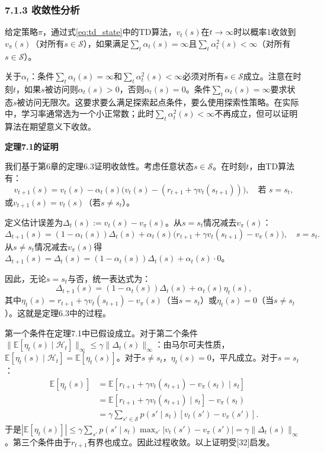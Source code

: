 \documentclass[UTF8]{article}
\begin{document}
\subsubsection*{7.1.3 收敛性分析}

\begin{theorembox}[7.1 TD学习的收敛性]
给定策略$\pi$，通过式\eqref{eq:td_state}中的TD算法，$v_t(s)$在$t \to \infty$时以概率1收敛到$v_\pi(s)$（对所有$s \in \mathcal{S}$），如果满足$\sum_t \alpha_t(s) = \infty$且$\sum_t \alpha_t^2(s) < \infty$（对所有$s \in \mathcal{S}$）。
\end{theorembox}

关于$\alpha_t$：条件$\sum_t \alpha_t(s) = \infty$和$\sum_t \alpha_t^2(s) < \infty$必须对所有$s \in \mathcal{S}$成立。注意在时刻$t$，如果$s$被访问则$\alpha_t(s) > 0$，否则$\alpha_t(s) = 0$。条件$\sum_t \alpha_t(s) = \infty$要求状态$s$被访问无限次。这要求要么满足探索起点条件，要么使用探索性策略。在实际中，学习率通常选为一个小正常数；此时$\sum_t \alpha_t^2(s) < \infty$不再成立，但可以证明算法在期望意义下收敛。

\begin{proofbox}
\textbf{定理7.1的证明}

我们基于第6章的定理6.3证明收敛性。考虑任意状态$s \in \mathcal{S}$。在时刻$t$，由TD算法有：
\[
v_{t+1}(s) = v_t(s) - \alpha_t(s)\Big(v_t(s) - (r_{t+1} + \gamma v_t(s_{t+1}))\Big), \quad \text{若 } s = s_t,
\]
或$v_{t+1}(s) = v_t(s)$（若$s \neq s_t$）。

定义估计误差为$\Delta_t(s) := v_t(s) - v_\pi(s)$。从$s = s_t$情况减去$v_\pi(s)$：
\[
\Delta_{t+1}(s) = (1 - \alpha_t(s))\Delta_t(s) + \alpha_t(s)\big(r_{t+1} + \gamma v_t(s_{t+1}) - v_\pi(s)\big), \quad s = s_t.
\]
从$s \neq s_t$情况减去$v_\pi(s)$得$\Delta_{t+1}(s) = \Delta_t(s) = (1 - \alpha_t(s))\Delta_t(s) + \alpha_t(s) \cdot 0$。

因此，无论$s = s_t$与否，统一表达式为：
\[
\Delta_{t+1}(s) = (1 - \alpha_t(s))\Delta_t(s) + \alpha_t(s)\eta_t(s),
\]
其中$\eta_t(s) = r_{t+1} + \gamma v_t(s_{t+1}) - v_\pi(s)$（当$s = s_t$）或$\eta_t(s) = 0$（当$s \neq s_t$）。这就是定理6.3中的过程。

第一个条件在定理7.1中已假设成立。对于第二个条件$\|\mathbb{E}[\eta_t(s) \mid \mathcal{H}_t]\|_\infty \leq \gamma \|\Delta_t(s)\|_\infty$：由马尔可夫性质，$\mathbb{E}[\eta_t(s) \mid \mathcal{H}_t] = \mathbb{E}[\eta_t(s)]$。对于$s \neq s_t$，$\eta_t(s) = 0$，平凡成立。对于$s = s_t$：
\[
\begin{aligned}
\mathbb{E}[\eta_t(s)] &= \mathbb{E}[r_{t+1} + \gamma v_t(s_{t+1}) - v_\pi(s_t) \mid s_t] \\
&= \mathbb{E}[r_{t+1} + \gamma v_t(s_{t+1}) \mid s_t] - v_\pi(s_t) \\
&= \gamma \sum_{s' \in \mathcal{S}} p(s' \mid s_t)[v_t(s') - v_\pi(s')].
\end{aligned}
\]
于是$|\mathbb{E}[\eta_t(s)]| \leq \gamma \sum_{s'} p(s' \mid s_t) \max_{s'} |v_t(s') - v_\pi(s')| = \gamma \|\Delta_t(s)\|_\infty$。第三个条件由于$r_{t+1}$有界也成立。因此过程收敛。以上证明受[32]启发。
\end{proofbox}
\end{document}
